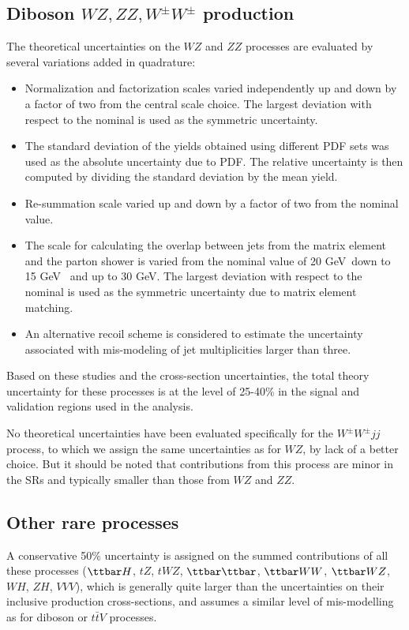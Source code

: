 \subsection*{Diboson $WZ, ZZ, W^\pm W^\pm$ production}

The theoretical uncertainties on the  $WZ$ and $ZZ$ processes are evaluated by several variations added in quadrature:
\begin{itemize}
\item Normalization and factorization scales varied independently up and down by a factor of two from the central scale choice. The largest deviation with respect to the nominal is used as the 
symmetric uncertainty.
\item The standard deviation of the yields obtained using different PDF sets was used as the absolute uncertainty due to PDF. 
The relative uncertainty is then computed by dividing the standard deviation by the mean yield.
\item Re-summation scale varied up and down by a factor of two from the nominal value.
\item The scale for calculating the overlap between jets from the matrix element and the parton shower is varied from the nominal value of 20 GeV~down to 15 GeV~
 and up to 30 GeV. The largest deviation with respect to the nominal is used as the symmetric uncertainty due to matrix element matching.
\item An alternative recoil scheme is considered to estimate the uncertainty associated with mis-modeling of jet multiplicities larger than three.
\end{itemize}

Based on these studies and the cross-section uncertainties, the total theory uncertainty for these processes is at the level of 25-40\% in the signal and validation regions used in the analysis. 

No theoretical uncertainties have been evaluated specifically for the $W^\pm W^\pm jj$ process, 
to which we assign the same uncertainties as for $WZ$, by lack of a better choice. 
But it should be noted that contributions from this process are minor in the SRs and typically  
smaller than those from $WZ$ and $ZZ$.

\subsection*{Other rare processes}
A conservative 50\% uncertainty is assigned on the summed contributions 
of all these processes ($\ttbar H$, $tZ$, $tWZ$, $\ttbar\ttbar$, $\ttbar WW$, $\ttbar WZ$, $WH$, $ZH$, $VVV$), 
which is generally quite larger than the uncertainties on their inclusive production cross-sections, 
and assumes a similar level of mis-modelling as for diboson or $t\bar t V$ processes. 
